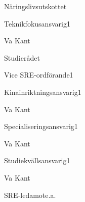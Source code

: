 \documentclass[10pt]{article}
\begin{document}
\begin{valforslagslista}
        \begin{utskott}{Näringslivsutskottet}
            \begin{post}{Teknikfokusansvarig}{1}
                \item Va Kant
            \end{post}
        \end{utskott}
        \begin{utskott}{Studierådet}
            \begin{post}{Vice SRE-ordförande}{1}
            \end{post}
            \begin{post}{Kinainriktningsansvarig}{1}
                \item Va Kant
            \end{post}
            \begin{post}{Specialiseringsansvarig}{1}
                \item Va Kant
            \end{post}
            \begin{post}{Studiekvällsansvarig}{1}
                \item Va Kant
            \end{post}
            \begin{post}{SRE-ledamot}{e.a.}
            \end{post}
        \end{utskott}
    \end{valforslagslista}
\end{document}
